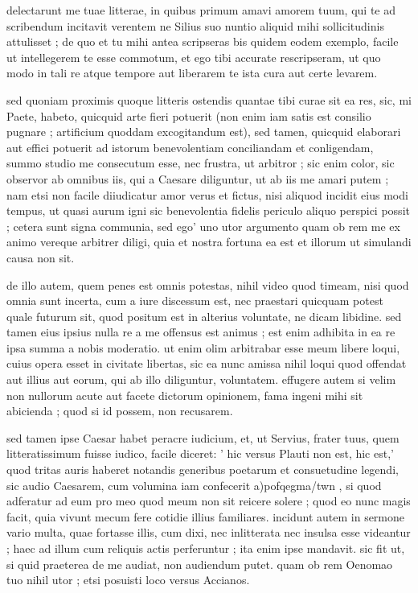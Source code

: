 


 delectarunt me tuae litterae, in quibus primum amavi amorem tuum, qui te ad scribendum incitavit verentem ne Silius suo nuntio aliquid mihi sollicitudinis attulisset ; de quo et tu mihi antea scripseras bis quidem eodem exemplo, facile ut intellegerem te esse commotum, et ego tibi accurate rescripseram, ut quo modo in tali re atque tempore aut liberarem te ista cura aut certe levarem.

 sed quoniam proximis quoque litteris ostendis quantae tibi curae sit ea res, sic, mi Paete, habeto, quicquid arte fieri potuerit (non enim iam satis est consilio pugnare ; artificium quoddam excogitandum est), sed tamen, quicquid elaborari aut effici potuerit ad istorum benevolentiam conciliandam et conligendam, summo studio me consecutum esse, nec frustra, ut arbitror ; sic enim color, sic observor ab omnibus iis, qui a Caesare diliguntur, ut ab iis me amari putem ; nam etsi non facile diiudicatur amor verus et fictus, nisi aliquod incidit eius modi tempus, ut quasi aurum igni sic benevolentia fidelis periculo aliquo perspici possit ; cetera sunt signa communia, sed ego' uno utor argumento quam ob rem me ex animo vereque arbitrer diligi, quia et nostra fortuna ea est et illorum ut simulandi causa non sit.

 de illo autem, quem penes est omnis potestas, nihil video quod timeam, nisi quod omnia sunt incerta, cum a iure discessum est, nec praestari quicquam potest quale futurum sit, quod positum est in alterius voluntate, ne dicam libidine. sed tamen eius ipsius nulla re a me offensus est animus ; est enim adhibita in ea re ipsa summa a nobis moderatio. ut enim olim arbitrabar esse meum libere loqui, cuius opera esset in civitate libertas, sic ea nunc amissa nihil loqui quod offendat aut illius aut eorum, qui ab illo diliguntur, voluntatem. effugere autem si velim non nullorum acute aut facete dictorum opinionem, fama ingeni mihi sit abicienda ; quod si id possem, non recusarem.

 sed tamen ipse Caesar habet peracre iudicium, et, ut Servius, frater tuus, quem litteratissimum fuisse iudico, facile diceret: ' hic versus Plauti non est, hic est,' quod tritas auris haberet notandis generibus poetarum et consuetudine legendi, sic audio Caesarem, cum volumina iam confecerit a)pofqegma/twn , si quod adferatur ad eum pro meo quod meum non sit reicere solere ; quod eo nunc magis facit, quia vivunt mecum fere cotidie illius familiares. incidunt autem in sermone vario multa, quae fortasse illis, cum dixi, nec inlitterata nec insulsa esse videantur ; haec ad illum cum reliquis actis perferuntur ; ita enim ipse mandavit. sic fit ut, si quid praeterea de me audiat, non audiendum putet. quam ob rem Oenomao tuo nihil utor ; etsi posuisti loco versus Accianos.

